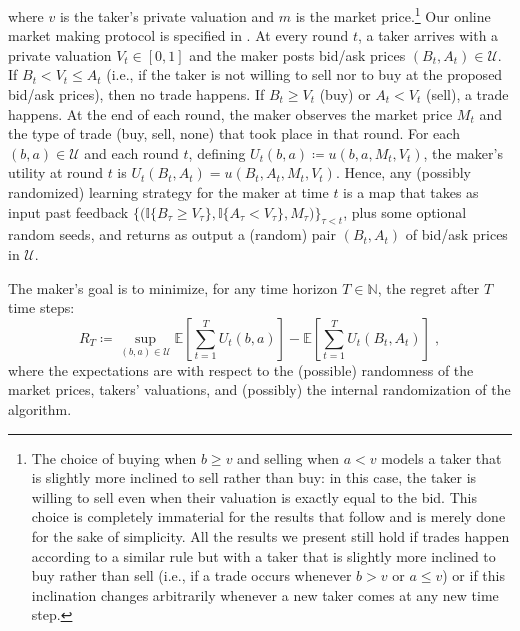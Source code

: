 \documentclass[final,12pt]{colt2025}
\newcommand{\cU}{\mathcal{U}}
\newcommand{\E}{\mathbb{E}}
\newcommand{\N}{\mathbb{N}}
\newcommand{\lsb}[1]{\left[#1\right]}
\newcommand{\one}[1]{\mathbb{I}\{#1\}}
\newcommand{\ceq}{\coloneqq}
\newcommand{\util}{u}
\newcommand{\Util}{U}
\newcommand{\nP}{M}
\newcommand{\np}{m}
\newcommand{\nZ}{V}
\newcommand{\nz}{v}
\newcommand{\nB}{B}
\newcommand{\nb}{b}
\newcommand{\nS}{A}
\newcommand{\ns}{a}
\begin{document}
where $\nz$ is the taker's private valuation and $\np$ is the market price.\footnote{%
The choice of buying when $\nb\ge \nz$ and selling when $\ns<\nz$ models a taker that is slightly more inclined to sell rather than buy: in this case, the taker is willing to sell even when their valuation is exactly equal to the bid. 
This choice is completely immaterial for the results that follow and is merely done for the sake of simplicity. 
All the results we present still hold if trades happen according to a similar rule but with a taker that is slightly more inclined to buy rather than sell (i.e., if a trade occurs whenever $\nb > \nz$ or $\ns\le\nz$) or if this inclination changes arbitrarily whenever a new taker comes at any new time step.}
%
Our online market making protocol is specified in .
At every round $t$, a taker arrives with a private valuation $\nZ_t \in [0,1]$ and the maker posts bid/ask prices $(\nB_t, \nS_t) \in \cU$.
If $\nB_t < \nZ_t \le \nS_t$ (i.e., if the taker is not willing to sell nor to buy at the proposed bid/ask prices), then no trade happens.
If $\nB_t \ge \nZ_t$ (buy) or $\nS_t < \nZ_t$ (sell), a trade happens.
At the end of each round, the maker observes the market price $\nP_t$ and the type of trade (buy, sell, none) that took place in that round.
For each $(b,a) \in \cU$ and each round $t$, defining $U_t(b,a) \coloneqq u(b,a,\nP_t,\nZ_t)$, the maker's utility at round $t$ is  $\Util_t(\nB_t,\nS_t) = \util(\nB_t,\nS_t,\nP_t,\nZ_t)$. 
Hence, any (possibly randomized) learning strategy for the maker at time $t$ is a map that takes as input past feedback $\big\{ \big(\one{\nB_{\tau} \ge \nZ_{\tau}}, \one{\nS_{\tau} < \nZ_{\tau}}, \nP_{\tau} \big)\big\}_{\tau < t}$, plus some optional random seeds, and returns as output a (random) pair $(\nB_t,\nS_t)$ of bid/ask prices in $\cU$.

The maker's goal is to minimize, for any time horizon $T\in\N$, the regret after $T$ time steps:
\[
    R_T 
\ceq
    \sup_{(\nb, \ns)\in \cU} 
    \E\lsb{ \sum_{t=1}^T \Util_t(\nb, \ns) }
    -
    \E\lsb{ \sum_{t=1}^T \Util_t(\nB_t, \nS_t) } \;,
\]
where the expectations are with respect to the (possible) randomness of the market prices, takers' valuations, and (possibly) the internal randomization of the algorithm.


\iffalse
\end{document}
